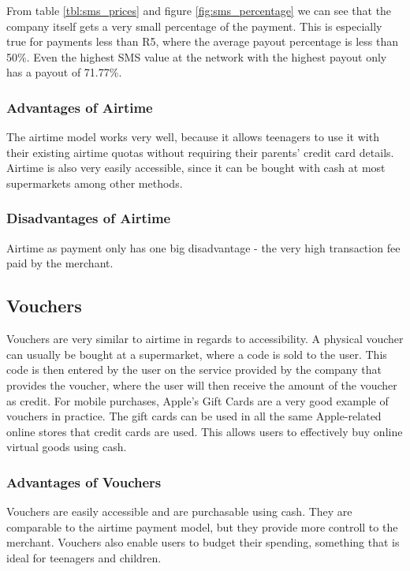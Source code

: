 From table \ref{tbl:sms_prices} and figure \ref{fig:sms_percentage} we can see that the company itself gets a very small percentage of the payment. This is especially true for payments less than R5, where the average payout percentage is less than 50\%. Even the highest SMS value at the network with the highest payout only has a payout of 71.77\%.

\subsubsection{Advantages of Airtime}

The airtime model works very well, because it allows teenagers to use it with their existing airtime quotas without requiring their parents' credit card details. Airtime is also very easily accessible, since it can be bought with cash at most supermarkets among other methods. 

\subsubsection{Disadvantages of Airtime}

Airtime as payment only has one big disadvantage - the very high transaction fee paid by the merchant. 


\subsection{Vouchers}

Vouchers are very similar to airtime in regards to accessibility. A physical voucher can usually be bought at a supermarket, where a code is sold to the user. This code is then entered by the user on the service provided by the company that provides the voucher, where the user will then receive the amount of the voucher as credit. For mobile purchases, Apple's Gift Cards are a very good example of vouchers in practice. The gift cards can be used in all the same Apple-related online stores that credit cards are used. This allows users to effectively buy online virtual goods using cash.

\subsubsection{Advantages of Vouchers}

Vouchers are easily accessible and are purchasable using cash. They are comparable to the airtime payment model, but they provide more controll to the merchant. Vouchers also enable users to budget their spending, something that is ideal for teenagers and children.

